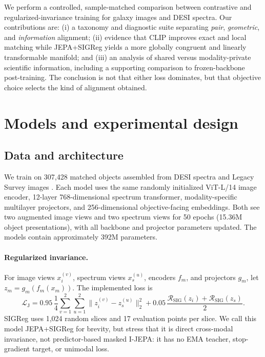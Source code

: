 \documentclass{article}
\begin{document}
We perform a controlled, sample-matched comparison between contrastive and regularized-invariance training for galaxy images and DESI spectra.
Our contributions are:
(i) a taxonomy and diagnostic suite separating \emph{pair}, \emph{geometric}, and \emph{information} alignment;
(ii) evidence that CLIP improves exact and local matching while JEPA+SIGReg yields a more globally congruent and linearly transformable manifold; and
(iii) an analysis of shared versus modality-private scientific information, including a supporting comparison to frozen-backbone post-training.
The conclusion is not that either loss dominates, but that objective choice selects the kind of alignment obtained.

\section{Models and experimental design}
\label{sec:method}

\subsection{Data and architecture}

We train on 307,428 matched objects assembled from DESI spectra \citep{desi2024edr} and Legacy Survey images \citep{dey2019legacy}.
Each model uses the same randomly initialized ViT-L/14 image encoder, 12-layer 768-dimensional spectrum transformer, modality-specific multilayer projectors, and 256-dimensional objective-facing embeddings.
Both see two augmented image views and two spectrum views for 50 epochs (15.36M object presentations), with all backbone and projector parameters updated.
The models contain approximately 392M parameters.

\paragraph{Regularized invariance.}
For image views $x_i^{(v)}$, spectrum views $x_s^{(u)}$, encoders $f_m$, and projectors $g_m$, let $z_m=g_m(f_m(x_m))$.
The implemented loss is
\begin{equation}
\mathcal L_{\mathrm{J}}
=0.95\,\frac{1}{4}\sum_{v=1}^{2}\sum_{u=1}^{2}
\lVert z_i^{(v)}-z_s^{(u)}\rVert_2^2
+0.05\,\frac{\mathcal R_{\mathrm{SIG}}(z_i)+\mathcal R_{\mathrm{SIG}}(z_s)}{2}.
\label{eq:jepa}
\end{equation}
SIGReg uses 1,024 random slices and 17 evaluation points per slice.
We call this model JEPA+SIGReg for brevity, but stress that it is direct cross-modal invariance, not predictor-based masked I-JEPA: it has no EMA teacher, stop-gradient target, or unimodal loss.
\end{document}
